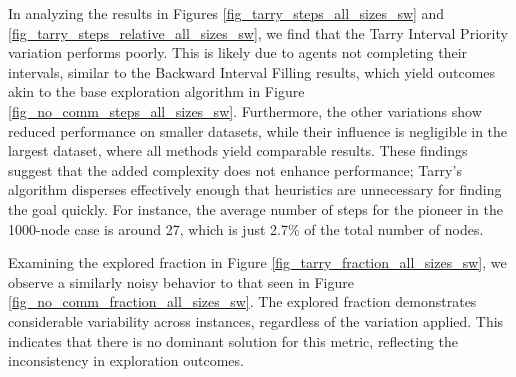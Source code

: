 In analyzing the results in Figures \ref{fig_tarry_steps_all_sizes_sw} and \ref{fig_tarry_steps_relative_all_sizes_sw}, we find that the Tarry Interval Priority variation performs poorly. This is likely due to agents not completing their intervals, similar to the Backward Interval Filling results, which yield outcomes akin to the base exploration algorithm in Figure \ref{fig_no_comm_steps_all_sizes_sw}. Furthermore, the other variations show reduced performance on smaller datasets, while their influence is negligible in the largest dataset, where all methods yield comparable results. These findings suggest that the added complexity does not enhance performance; Tarry's algorithm disperses effectively enough that heuristics are unnecessary for finding the goal quickly. For instance, the average number of steps for the pioneer in the 1000-node case is around 27, which is just 2.7\% of the total number of nodes.

Examining the explored fraction in Figure \ref{fig_tarry_fraction_all_sizes_sw}, we observe a similarly noisy behavior to that seen in Figure \ref{fig_no_comm_fraction_all_sizes_sw}. The explored fraction demonstrates considerable variability across instances, regardless of the variation applied. This indicates that there is no dominant solution for this metric, reflecting the inconsistency in exploration outcomes.